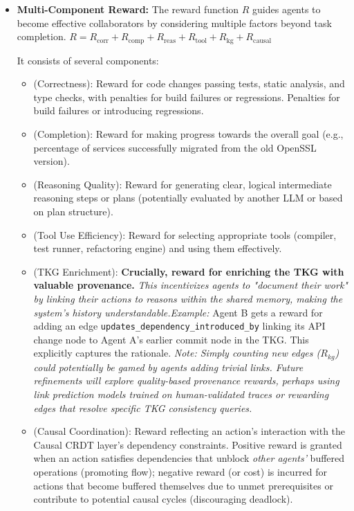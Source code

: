 \documentclass{article}
\begin{document}
\begin{itemize}
     \item \textbf{Multi-Component Reward:} The reward function $R$ guides agents to become effective collaborators by considering multiple factors beyond task completion.
$R = R_{\text{corr}} + R_{\text{comp}} + R_{\text{reas}} + R_{\text{tool}} + R_{\text{kg}} + R_{\text{causal}}$

It consists of several components:
    \begin{itemize}
        \item  (Correctness): Reward for code changes passing tests, static analysis, and type checks, with penalties for build failures or regressions. Penalties for build failures or introducing regressions.
        \item  (Completion): Reward for making progress towards the overall goal (e.g., percentage of services successfully migrated from the old OpenSSL version).
        \item  (Reasoning Quality): Reward for generating clear, logical intermediate reasoning steps or plans (potentially evaluated by another LLM or based on plan structure).
        \item  (Tool Use Efficiency): Reward for selecting appropriate tools (compiler, test runner, refactoring engine) and using them effectively.
         \item  (TKG Enrichment): \textbf{Crucially, reward for enriching the TKG with valuable provenance.} \textit{This incentivizes agents to "document their work" by linking their actions to reasons within the shared memory, making the system's history understandable.}\textit{Example:} Agent B gets a reward for adding an edge \verb|updates_dependency_introduced_by| linking its API change node to Agent A's earlier commit node in the TKG. This explicitly captures the rationale.
         \textit{Note: Simply counting new edges ($R_{kg}$) could potentially be gamed by agents adding trivial links. Future refinements will explore quality-based provenance rewards, perhaps using link prediction models trained on human-validated traces or rewarding edges that resolve specific TKG consistency queries.}
        \item  (Causal Coordination): Reward reflecting an action's interaction with the Causal CRDT layer's dependency constraints. Positive reward is granted when an action satisfies dependencies that unblock \textit{other agents'} buffered operations (promoting flow); negative reward (or cost) is incurred for actions that become buffered themselves due to unmet prerequisites or contribute to potential causal cycles (discouraging deadlock).

\end{itemize}
\end{itemize}
\end{document}
